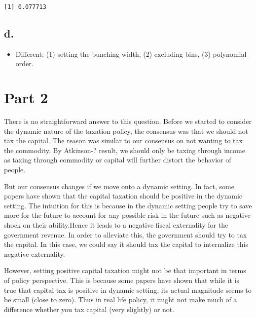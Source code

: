 \documentclass[
  letterpaper,
  DIV=11,
  numbers=noendperiod]{scrartcl}
\newenvironment{Shaded}{\begin{snugshade}}{\end{snugshade}}
\newcommand{\CommentTok}[1]{\textcolor[rgb]{0.37,0.37,0.37}{#1}}
\newcommand{\NormalTok}[1]{\textcolor[rgb]{0.00,0.23,0.31}{#1}}
\newcommand{\SpecialCharTok}[1]{\textcolor[rgb]{0.37,0.37,0.37}{#1}}
\providecommand{\tightlist}{%
  \setlength{\itemsep}{0pt}\setlength{\parskip}{0pt}}\usepackage{longtable,booktabs,array}
\begin{document}
\begin{Shaded}
\end{Shaded}

\begin{verbatim}
[1] 0.077713
\end{verbatim}

\subsection{d.}\label{d.}

\begin{itemize}
\tightlist
\item
  Different: (1) setting the bunching width, (2) excluding bins, (3)
  polynomial order.
\end{itemize}

\section{Part 2}\label{part-2}

There is no straightforward answer to this question. Before we started
to consider the dynamic nature of the taxation policy, the consensus was
that we should not tax the capital. The reason was similar to our
consensus on not wanting to tax the commodity. By Atkinson-? result, we
should only be taxing through income as taxing through commodity or
capital will further distort the behavior of people.

But our consensus changes if we move onto a dynamic setting. In fact,
some papers have shown that the capital taxation should be positive in
the dynamic setting. The intuition for this is because in the dynamic
setting people try to save more for the future to account for any
possible risk in the future such as negative shock on their
ability.Hence it leads to a negative fiscal externality for the
government revenue. In order to alleviate this, the government should
try to tax the capital. In this case, we could say it should tax the
capital to internalize this negative externality.

However, setting positive capital taxation might not be that important
in terms of policy perspective. This is because some papers have shown
that while it is true that capital tax is positive in dynamic setting,
its actual magnitude seems to be small (close to zero). Thus in real
life policy, it might not make much of a difference whether you tax
capital (very slightly) or not.
\end{document}
